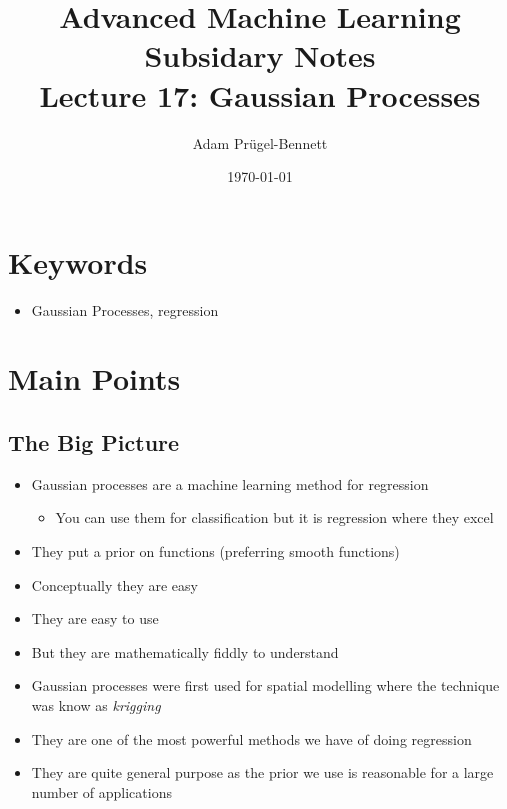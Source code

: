 \documentclass[11pt]{article}
\author{Adam Prügel-Bennett}
\date{\today}
\title{Advanced Machine Learning Subsidary Notes\\\medskip
\large Lecture 17: Gaussian Processes}
\begin{document}
\maketitle


\section{Keywords}
\label{sec:org62ddf17}
\begin{itemize}
\item Gaussian Processes, regression
\end{itemize}

\section{Main Points}
\label{sec:orgbd48364}

\subsection{The Big Picture}
\label{sec:org67556c9}
\begin{itemize}
\item Gaussian processes are a machine learning method for regression
\begin{itemize}
\item You can use them for classification but it is regression where they excel
\end{itemize}
\item They put a prior on functions (preferring smooth functions)
\item Conceptually they are easy
\item They are easy to use
\item But they are mathematically fiddly to understand
\item Gaussian processes were first used for spatial modelling where
the technique was know as \emph{krigging}
\item They are one of the most powerful methods we have of doing regression
\item They are quite general purpose as the prior we use is reasonable
for a large number of applications
\end{itemize}
\end{document}

